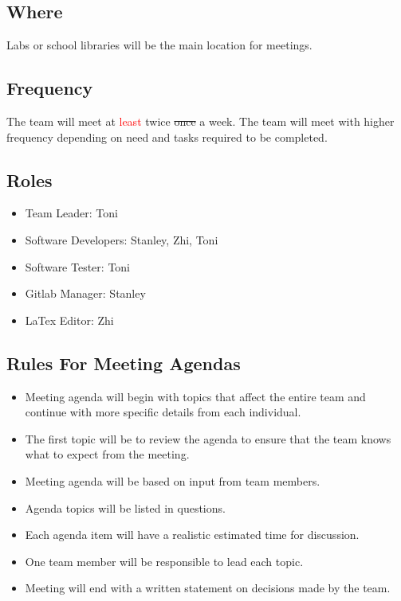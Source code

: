 \documentclass{article}
\begin{document}
\subsection{Where}
Labs or school libraries will be the main location for meetings.

\subsection{Frequency}
The team will meet at \textcolor{red}{least} twice \st{once} a week. The team will meet with higher frequency depending on need and tasks required to be completed.

\subsection{Roles}
\begin{itemize}
    \item Team Leader: Toni
    \item Software Developers: Stanley, Zhi, Toni
    \item Software Tester: Toni
    \item Gitlab Manager: Stanley
    \item LaTex Editor: Zhi
\end{itemize}

\subsection{Rules For Meeting Agendas}
\begin{itemize}
    \item Meeting agenda will begin with topics that affect the entire team and continue with more specific details from each individual.
    \item The first topic will be to review the agenda to ensure that the team knows what to expect from the meeting.
    \item Meeting agenda will be based on input from team members.
    \item Agenda topics will be listed in questions.
    \item Each agenda item will have a realistic estimated time for discussion.
    \item One team member will be responsible to lead each topic.
    \item Meeting will end with a written statement on decisions made by the team.
\end{itemize}
\end{document}
